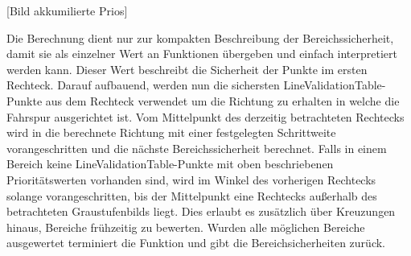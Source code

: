 [Bild akkumilierte Prios]

Die Berechnung dient nur zur kompakten Beschreibung der Bereichssicherheit, damit sie als einzelner Wert an Funktionen {\"u}bergeben und einfach interpretiert werden kann. Dieser Wert beschreibt die Sicherheit der Punkte im ersten Rechteck.
Darauf aufbauend, werden nun die sichersten LineValidationTable-Punkte aus dem Rechteck verwendet um die Richtung zu erhalten in welche die Fahrspur ausgerichtet ist. Vom Mittelpunkt des derzeitig betrachteten Rechtecks wird in die berechnete Richtung mit einer festgelegten Schrittweite vorangeschritten und die n{\"a}chste Bereichssicherheit berechnet.
Falls in einem Bereich keine LineValidationTable-Punkte mit oben beschriebenen Priorit{\"a}tswerten vorhanden sind, wird im Winkel des vorherigen Rechtecks solange vorangeschritten, bis der Mittelpunkt eine Rechtecks au{\ss}erhalb des betrachteten Graustufenbilds liegt. Dies erlaubt es zus{\"a}tzlich {\"u}ber Kreuzungen hinaus, Bereiche fr{\"u}hzeitig zu bewerten.
Wurden alle m{\"o}glichen Bereiche ausgewertet terminiert die Funktion und gibt die Bereichsicherheiten zur{\"u}ck.









